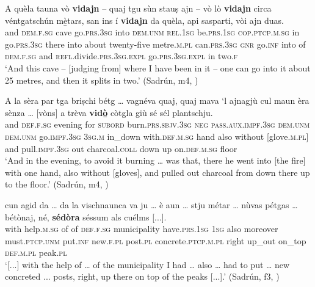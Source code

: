 \ea
\label{ex:vidajn}
\gll A quèla tauna vò \textbf{vidajn} – quaj tgu sùn stauṣ ajn – vò lò \textbf{vidajn} circa véntgatschún mè̱tars, san\footnotemark {} ins í \textbf{vidajn} da quèla, api sasparti, vòi ajn duas.\\
and \textsc{dem.f.sg} cave go.\textsc{prs.3sg} into {}  \textsc{dem.unm} \textsc{rel.1sg} be.\textsc{prs.1sg} \textsc{cop.ptcp.m.sg} in {} go.\textsc{prs.3sg} there into about twenty-five metre.\textsc{m.pl} can.\textsc{prs.3sg} \textsc{gnr} go.\textsc{inf} into of \textsc{dem.f.sg} and \textsc{refl}.divide.\textsc{prs.3sg.expl} go.\textsc{prs.3sg.expl} in two.\textsc{f}  \\
\glt `And this cave – [judging from] where I have been in it – one can go into it about 25 metres, and then it splits in two.' (Sadrún, m4, )
\z


\ea
\label{ex:vidora}
\gll  A la sèra par tga briṣchi bétg … vagnéva quaj, quaj mava `l ajnagjù cul maun èra sènza … [vòns] a trèva \textbf{vidò̱} còtgla giù sé sél plantschju.  \\
and \textsc{def.f.sg} evening for \textsc{subord} burn.\textsc{prs.sbjv.3sg} \textsc{neg} {} \textsc{pass.aux.impf.3sg} \textsc{dem.unm} \textsc{dem.unm} go.\textsc{impf.3sg} \textsc{3sg.m} in\_down with.\textsc{def.m.sg} hand also without {} [glove.\textsc{m.pl}] and pull.\textsc{impf.3sg} out charcoal.\textsc{coll} down up on.\textsc{def.m.sg} floor  \\
\glt `And in the evening, to avoid it burning … was that, there he went into [the fire] with one hand, also without [gloves], and pulled out charcoal from down there up to the floor.' (Sadrún, m4, )
\z

\ea
\label{ex:sedora}
\gll  [...] cun agid da … da la vischnaunca va ju … è aun … stju métar … nùvas pétgas … bétònaj,\footnotemark {} né, \textbf{sédòra} séssum als cuélms [...].\\
{} with help.\textsc{m.sg} of {} of  \textsc{def.f.sg} municipality have.\textsc{prs.1sg} \textsc{1sg} {} also moreover {} must.\textsc{ptcp.unm} put.\textsc{inf} {} new.\textsc{f.pl}  post.\textsc{pl} {} concrete.\textsc{ptcp.m.pl} right up\_out  on\_top \textsc{def.m.pl} peak.\textsc{pl}\\
\glt `[...] with the help of … of the municipality I had … also … had to put … new concreted ... posts, right, up there on top of the peaks [...].' (Sadrún, f3, )
\z

